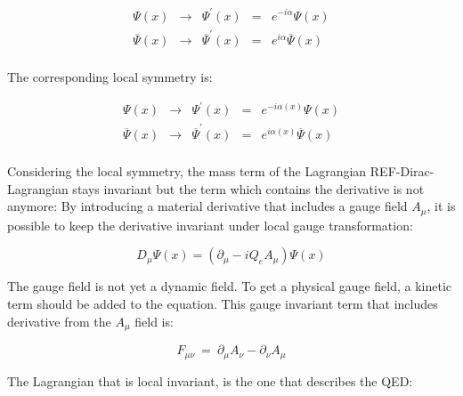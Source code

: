       \begin{equation}
            \begin{array}{rrccr}
             \Psi \left(x \right) & \rightarrow & \Psi^{'} \left(x \right)  & = & e^{-i\alpha} \Psi\left(x\right) \\
             \overline{\Psi}\left(x\right) & \rightarrow & \overline{\Psi}^{'}\left(x\right) & = & e^{i\alpha}  \overline{\Psi}\left(x\right) \\
            \end{array}
      \end{equation}

      The corresponding local symmetry is:

      \begin{equation}
            \begin{array}{rcccr}
             \Psi\left(x\right) & \rightarrow & \Psi^{'} \left(x \right) & = & e^{-i\alpha(x)} \Psi\left(x\right) \\
             \overline{\Psi}\left(x\right) & \rightarrow & \overline{\Psi}^{'}\left(x\right) & = & e^{i\alpha(x)}  \overline{\Psi}\left(x\right) \\
            \end{array}
      \end{equation}

      Considering the local symmetry, the mass term of the Lagrangian REF-Dirac-Lagrangian stays invariant but the term which contains the derivative is not anymore:
      By introducing a material derivative that includes a gauge field $A_{\mu}$, it is possible to keep the derivative invariant under local gauge transformation:

      \begin{equation}
        D_{\mu} \Psi\left(x\right) =  \left(\partial_{\mu} - i Q_e A_{\mu}\right) \Psi\left(x\right)
      \end{equation}

     The gauge field is not yet a dynamic field. To get a physical gauge field, a kinetic term should be added to the equation.
     This gauge invariant term that includes derivative from the $A_{\mu}$ field is:
    
     \begin{equation}
       F_{\mu \nu} \ = \ \partial_\mu A_\nu - \partial_\nu A_\mu
     \end{equation}

     The Lagrangian that is local invariant, is the one that describes the QED:

